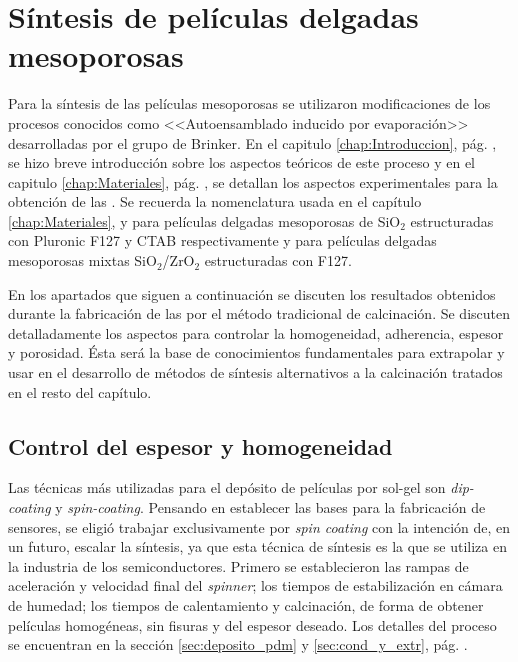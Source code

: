 \section{Síntesis de películas delgadas mesoporosas}
		
		Para la síntesis de las películas mesoporosas se utilizaron modificaciones de los procesos conocidos como <<Autoensamblado inducido por evaporación>> desarrolladas por el grupo de Brinker.\cite{Brinker1999} En el capitulo \ref{chap:Introduccion}, pág. \pageref{sec:mesoporosos}, se hizo breve introducción sobre los aspectos teóricos de este proceso y en el capitulo \ref{chap:Materiales}, pág. \pageref{sec:sintesis_mesoporosos}, se detallan los aspectos experimentales para la obtención de las \pdm. Se recuerda la nomenclatura usada en el capítulo \ref{chap:Materiales}, \pdmF\space y \pdmC\space para películas delgadas mesoporosas de SiO$_2$ estructuradas con Pluronic F127 y CTAB respectivamente y \pdmZ\space para películas delgadas mesoporosas mixtas SiO$_2$/ZrO$_2$ estructuradas con F127.

		En los apartados que siguen a continuación se discuten los resultados obtenidos durante la fabricación de las \pdm\space por el método tradicional de calcinación. Se discuten detalladamente los aspectos para controlar la homogeneidad, adherencia, espesor y porosidad. Ésta será la base de conocimientos fundamentales para extrapolar y usar en el desarrollo de métodos de síntesis alternativos a la calcinación tratados en el resto del capítulo.

	\subsection{Control del espesor y homogeneidad}
		
		Las técnicas más utilizadas para el depósito de películas por sol-gel son \textit{dip-coating} y \textit{spin-coating}. 
		Pensando en establecer las bases para la fabricación de sensores, se eligió trabajar exclusivamente por \textit{spin coating} con la intención de, en un futuro, escalar la síntesis, ya que esta técnica de síntesis es la que se utiliza en la industria de los semiconductores.\cite{Franssila2004,Jaeger2001} Primero se establecieron las rampas de aceleración y velocidad final del \textit{spinner}; los tiempos de estabilización en cámara de humedad; los tiempos de calentamiento y calcinación, de forma de obtener películas homogéneas, sin fisuras y del espesor deseado. Los detalles del proceso se encuentran en la sección \ref{sec:deposito_pdm} y \ref{sec:cond_y_extr}, pág. \pageref{sec:deposito_pdm}. 

